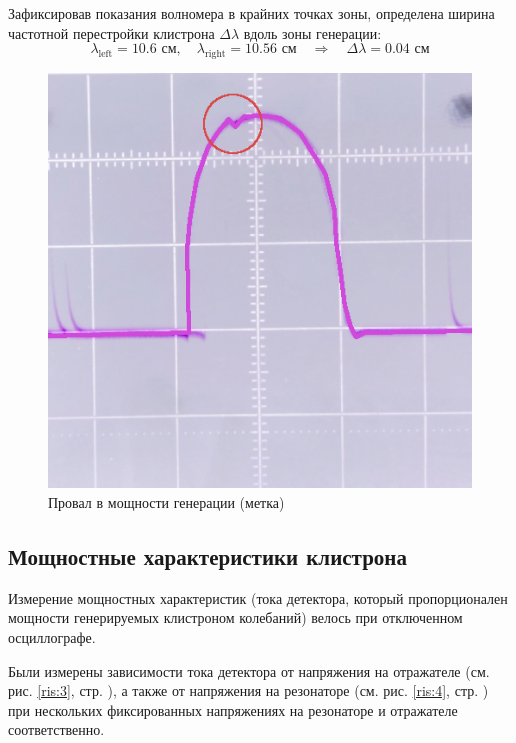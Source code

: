 \documentclass[a4paper,14pt]{extarticle}
\begin{document}
Зафиксировав показания волномера в крайних точках зоны,  определена ширина частотной перестройки клистрона $\Delta\lambda$ вдоль зоны генерации:
\begin{equation}
    \lambda_\text{left}=10.6\text{ см}, \quad
    \lambda_\text{right}=10.56\text{ см} \quad \Rightarrow \quad
    \Delta\lambda=0.04\text{ см}
\end{equation}

\begin{figure}[H]
    \centering
    \includegraphics[scale=1.5]{img/fig5}
    \caption{Провал в мощности генерации (метка)}
    \label{fig}
\end{figure}






\subsection{Мощностные характеристики клистрона}
Измерение мощностных характеристик (тока детектора, который пропорционален мощности генерируемых клистроном колебаний) велось при отключенном осциллографе. 

Были измерены зависимости тока детектора от напряжения на отражателе (см. рис. \ref{ris:3}, стр. \pageref{ris:3}), а также от напряжения на резонаторе (см. рис. \ref{ris:4}, стр. \pageref{ris:4}) при нескольких фиксированных напряжениях на резонаторе и отражателе соответственно.
\end{document}
